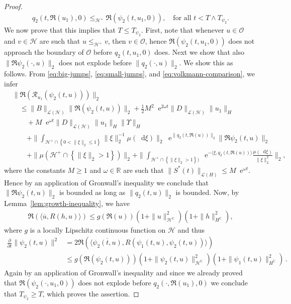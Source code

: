 \documentclass[10pt,a4paper,reqno]{amsart}
\newcommand*\D{\mathop{}\!\mathrm{d}}
\newcommand*\E{\mathop{}\!\mathrm{e}}
\numberwithin{equation}{section}
\theoremstyle{plain}
\theoremstyle{definition}
\theoremstyle{example}
\renewcommand{\MR}{\mathbb{R}}
\newcommand{\R}{\MR}
\newcommand{\cH}{\mathcal{H}}
\newcommand{\cL}{\mathcal{L}}
\newcommand{\cO}{\mathcal{O}}
\newcommand{\cR}{\mathcal{R}}
\newcommand{\set}[1]{\left\{ #1\right\}}
\newcommand{\norm}[1]{\|#1\|}
\newcommand{\cHplus}{\cH^{+}}
\begin{document}
\begin{proof}
  \begin{align}\label{eq:volkmann-comparison}
    q_{2}(t,\Re(u_1),0)\leq_{\cHplus}\Re(\psi_{2}(t,u_1,0)),\quad \text{for all } t<T\wedge T_{\psi_{2}}. 
  \end{align}
  We now prove that this implies that $T\leq T_{\psi_{2}}$. First, note   
  that whenever $u\in\cO$ and $v\in\cH$ are such that $u\leq_{\cHplus} v$,
  then $v\in\cO$, hence $\Re(\psi_{2}(t,u_1,0))$ does not approach the boundary of
  $\cO$ before $q_{2}(t,u_1,0)$ does. Next we show that also
  $\norm{\Re\psi_{2}(\cdot,u)}_2$ does not explode before
  $\norm{q_{2}(\cdot,u)}_2$. We show this as follows. From \eqref{eq:big-jumps}, \eqref{eq:small-jumps}, and \eqref{eq:volkmann-comparison}, we infer  
  \begin{align}\label{eq:existence-complex-solution-2}
  &\norm{\Re(\cR_{u_{1}}(\psi_{2}(t,u)))}_2\nonumber\\
  &\quad \leq
                                          \norm{{B}}_{\cL(\cH)}\norm{\Re(\psi_{2}(t,u))}_2+\frac{1}{2} M^2 \E^{2\omega t}\norm{D}_{\cL(\cH)}\norm{u_1}_H \nonumber\\
                                          &\qquad +M \E^{\omega t}\norm{D}_{\cL(\cH)}\norm{u_1}_H\norm{\Upsilon}_H \nonumber\\ 
                                        &\qquad + \norm{\int_{\cHplus\cap
                                          \set{0<\norm{\xi}_2\leq
                                          1}}\norm{\xi}_2^{-1}\mu(\D\xi)}_2\E^{\norm{q_{2}(t,\Re(u))}_2}\norm{\Re{\psi_{2}(t,u)}}_2\nonumber\\
    &\qquad
      +\norm{\mu(\cHplus\cap\set{\norm{\xi}_2>1})}_2+\norm{\int_{\cHplus\cap\set{\norm{\xi}_2>1})}\E^{-\langle\xi,q_{2}(t,\Re(u))\rangle}\frac{\mu(\D\xi)}{\norm{\xi}_2^{2}}}_2, 
  \end{align}
  where the constants $M \geq 1$ and $\omega \in \R$ are such that $\|S^*(t)\|_{\cL(H)} \leq M \E^{\omega t}$.
  Hence by an application of Gronwall's inequality we conclude that $\norm{\Re
    \psi_{2}(t,u)}_2$ is bounded as long as $\norm{q_{2}(t,u)}_2$ is bounded. Now, by
  Lemma~\ref{lem:growth-inequality}, we have 
  \begin{align*}
    \Re(\langle \overline{u},R(h,u)\rangle)\leq g(\Re(u))(1+\norm{u}_{\cH^\mathbb{C}}^{2})(1+\norm{h}_{H^\mathbb{C}}^{2}),
  \end{align*}
  where $g$ is a locally Lipschitz continuous function on $\cH$ and thus
  \begin{align*}
    \frac{\partial}{\partial t}\norm{\psi_{2}(t,u)}^{2}&=2\Re(\langle
                                                         \overline{\psi_{2}(t,u)},R(\psi_{1}(t,u),\psi_{2}(t,u))\rangle)\\
                                                       &\leq  g(\Re(\psi_{2}(t,u)))(1+\norm{\psi_{2}(t,u)}_{\cH^\mathbb{C}}^{2})(1+\norm{\psi_{1}(t,u)}_{H^\mathbb{C}}^{2})\,.
  \end{align*}
  Again by an application of Gronwall's inequality and since
  we already proved that $\Re(\psi_{2}(\cdot,u_1,0))$ does not explode before
  $q_{2}(\cdot,\Re(u_1),0)$ we conclude that $T_{\psi_{2}}\geq T$, which proves the assertion.
\end{proof}
\end{document}
